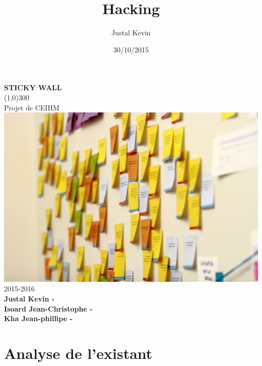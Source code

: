 \documentclass{article}
\title{Hacking}
\author{Justal Kevin}
\date{30/10/2015}
\begin{document}
\begin{center}
\textbf{\Huge{STICKY WALL}}\\
\line(1,0){300}\\
Projet de CEIHM\\
\vspace{3cm}
\includegraphics[width=\textwidth]{1}\\
\vspace{3cm}
2015-2016\\
\vspace{4.5cm}
\textbf{Justal Kevin - }\\
\textbf{Isoard Jean-Christophe - }\\
\textbf{Kha Jean-phillipe - }\\
\end{center}

\newpage
\tableofcontents

\newpage
\section{Analyse de l'existant}
\end{document}
